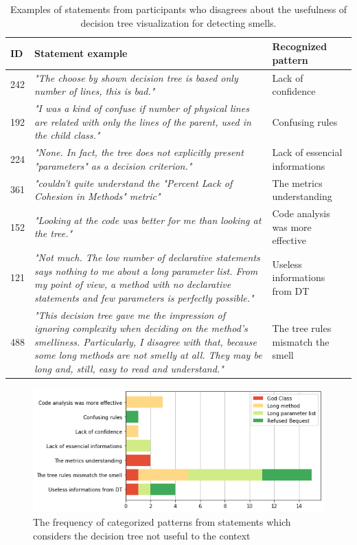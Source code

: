 \begin{table}[t]
\centering
\setlength{\extrarowheight}{0pt}
\addtolength{\extrarowheight}{\aboverulesep}
\addtolength{\extrarowheight}{\belowrulesep}
\setlength{\aboverulesep}{0pt}
\setlength{\belowrulesep}{0pt}
\begin{tabular}{p{1cm}p{10cm}p{3cm}}
\toprule
\rowcolor[rgb]{0.753,0.753,0.753}  \textbf{ID}      & \textbf{Statement example}      & \textbf{Recognized pattern}            \\ 
\toprule
242 & \textit{"The choose by shown decision tree is based only number of lines, this is bad."} & Lack of confidence  \\
192 & \textit{"I was a kind of confuse if number of physical lines are related with only the lines of the parent, used in the child class."} & Confusing rules  \\
224 & \textit{"None. In fact, the tree does not explicitly present "parameters" as a decision criterion."} & Lack of essencial informations  \\
361 & \textit{"couldn't quite understand the "Percent Lack of Cohesion in Methods" metric"} & The metrics understanding  \\
152 & \textit{"Looking at the code was better for me than looking at the tree."} & Code analysis was more effective  \\
121 & \textit{"Not much. The low number of declarative statements says nothing to me about a long parameter list. From my point of view, a method with no declarative statements and few parameters is perfectly possible."} & Useless informations from DT  \\
488 & \textit{"This decision tree gave me the impression of ignoring complexity when deciding on the method's smelliness. Particularly, I disagree with that, because some long methods are not smelly at all. They may be long and, still, easy to read and understand."} & The tree rules mismatch the smell  \\
\bottomrule
\end{tabular}
\caption{Examples of statements from participants who disagrees about the usefulness of decision tree visualization for detecting smells.}
\label{tbl:statementsUseless}

\end{table}

\begin{figure}[ht]
\centering
\includegraphics[width=\textwidth]{figures/useless_chart.png}
\caption{The frequency of categorized patterns from statements which considers the decision tree not useful to the context }
\label{fig:uselesschart}
\end{figure}

